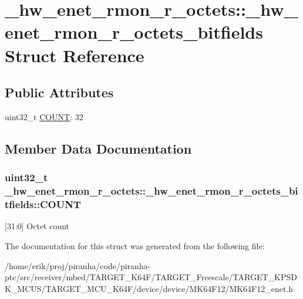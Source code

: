 \hypertarget{struct__hw__enet__rmon__r__octets_1_1__hw__enet__rmon__r__octets__bitfields}{}\section{\+\_\+hw\+\_\+enet\+\_\+rmon\+\_\+r\+\_\+octets\+:\+:\+\_\+hw\+\_\+enet\+\_\+rmon\+\_\+r\+\_\+octets\+\_\+bitfields Struct Reference}
\label{struct__hw__enet__rmon__r__octets_1_1__hw__enet__rmon__r__octets__bitfields}
\subsection*{Public Attributes}
\begin{DoxyCompactItemize}
\item 
uint32\+\_\+t \hyperlink{struct__hw__enet__rmon__r__octets_1_1__hw__enet__rmon__r__octets__bitfields_af1274c56ddea9109e38d11aca49f61fc}{C\+O\+U\+NT}\+: 32
\end{DoxyCompactItemize}


\subsection{Member Data Documentation}
\subsubsection[{\texorpdfstring{C\+O\+U\+NT}{COUNT}}]{\setlength{\rightskip}{0pt plus 5cm}uint32\+\_\+t \+\_\+hw\+\_\+enet\+\_\+rmon\+\_\+r\+\_\+octets\+::\+\_\+hw\+\_\+enet\+\_\+rmon\+\_\+r\+\_\+octets\+\_\+bitfields\+::\+C\+O\+U\+NT}\hypertarget{struct__hw__enet__rmon__r__octets_1_1__hw__enet__rmon__r__octets__bitfields_af1274c56ddea9109e38d11aca49f61fc}{}\label{struct__hw__enet__rmon__r__octets_1_1__hw__enet__rmon__r__octets__bitfields_af1274c56ddea9109e38d11aca49f61fc}
\mbox{[}31\+:0\mbox{]} Octet count 

The documentation for this struct was generated from the following file\+:\begin{DoxyCompactItemize}
\item 
/home/erik/proj/piranha/code/piranha-\/ptc/src/receiver/mbed/\+T\+A\+R\+G\+E\+T\+\_\+\+K64\+F/\+T\+A\+R\+G\+E\+T\+\_\+\+Freescale/\+T\+A\+R\+G\+E\+T\+\_\+\+K\+P\+S\+D\+K\+\_\+\+M\+C\+U\+S/\+T\+A\+R\+G\+E\+T\+\_\+\+M\+C\+U\+\_\+\+K64\+F/device/device/\+M\+K64\+F12/M\+K64\+F12\+\_\+enet.\+h\end{DoxyCompactItemize}
